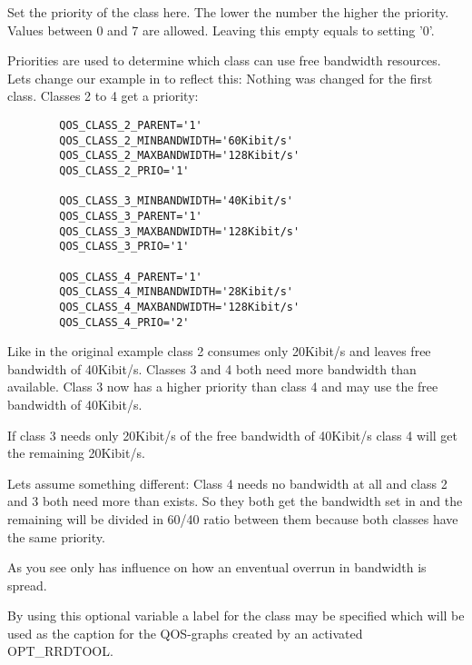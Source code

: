 \begin{description}

   Set the priority of the class here. The lower the number the higher the priority.
   Values between 0 and 7 are allowed. Leaving this empty equals to setting '0'.

   Priorities are used to determine which class can use free bandwidth resources.
   Lets change our example in 
   to reflect this:
   Nothing was changed for the first class. Classes 2 to 4 get a priority:

\begin{example}
\begin{verbatim}
        QOS_CLASS_2_PARENT='1'
        QOS_CLASS_2_MINBANDWIDTH='60Kibit/s'
        QOS_CLASS_2_MAXBANDWIDTH='128Kibit/s'
        QOS_CLASS_2_PRIO='1'

        QOS_CLASS_3_MINBANDWIDTH='40Kibit/s'
        QOS_CLASS_3_PARENT='1'
        QOS_CLASS_3_MAXBANDWIDTH='128Kibit/s'
        QOS_CLASS_3_PRIO='1'

        QOS_CLASS_4_PARENT='1'
        QOS_CLASS_4_MINBANDWIDTH='28Kibit/s'
        QOS_CLASS_4_MAXBANDWIDTH='128Kibit/s'
        QOS_CLASS_4_PRIO='2'
\end{verbatim}
\end{example}


   Like in the original example class 2 consumes only 20Kibit/s and leaves
   free bandwidth of 40Kibit/s. Classes 3 and 4 both need more bandwidth
   than available. Class 3 now has a higher priority than class 4 and
   may use the free bandwidth of 40Kibit/s.

   If class 3 needs only 20Kibit/s of the free bandwidth of 40Kibit/s
   class 4 will get the remaining 20Kibit/s.

   Lets assume something different: Class 4 needs no bandwidth at all and class
   2 and 3 both need more than exists. So they both get the bandwidth set in
    and the remaining will be divided in
   60/40 ratio between them because both classes have the same priority.

   As you see  only has influence on how an
   enventual overrun in bandwidth is spread.


   By using this optional variable a label for the class may be specified
   which will be used as the caption for the QOS-graphs created by an activated
   OPT\_RRDTOOL.


\end{description}
